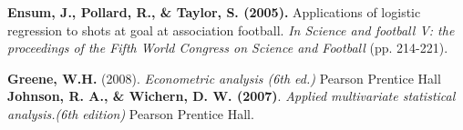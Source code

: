 \begin{thebibliography}{99}
\textbf{Ensum, J., Pollard, R., \& Taylor, S. (2005).} Applications of logistic regression to shots at goal at association football. \emph{In Science and football V: the proceedings of the Fifth World Congress on Science and Football} (pp. 214-221).

\textbf{Greene,  W.H.} (2008). \emph{Econometric analysis (6th ed.)} Pearson Prentice Hall
\textbf{Johnson, R. A., \& Wichern, D. W. (2007)}. \emph{Applied multivariate statistical analysis.(6th edition)} Pearson Prentice Hall.
\end{thebibliography}
 